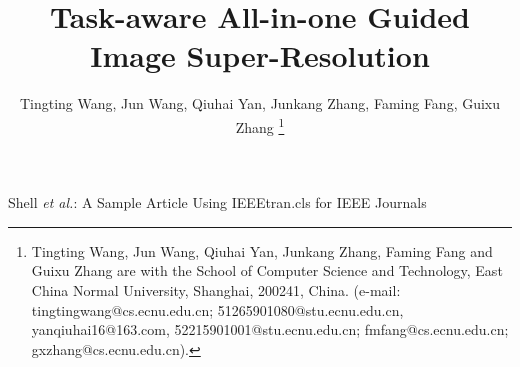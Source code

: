 \documentclass[lettersize,journal]{IEEEtran}
\begin{document}
\title{Task-aware All-in-one Guided Image Super-Resolution}

\author{Tingting Wang, Jun Wang, Qiuhai Yan, Junkang Zhang, Faming Fang,  Guixu Zhang 
\thanks{Tingting Wang, Jun Wang, Qiuhai Yan, Junkang Zhang, Faming Fang and Guixu Zhang are with the School of Computer Science and Technology, East China Normal University, Shanghai, 200241, China. (e-mail: tingtingwang@cs.ecnu.edu.cn; 51265901080@stu.ecnu.edu.cn, yanqiuhai16@163.com, 52215901001@stu.ecnu.edu.cn; fmfang@cs.ecnu.edu.cn; gxzhang@cs.ecnu.edu.cn).}}

%
{Shell \MakeLowercase{\textit{et al.}}: A Sample Article Using IEEEtran.cls for IEEE Journals}


\maketitle
\end{document}
